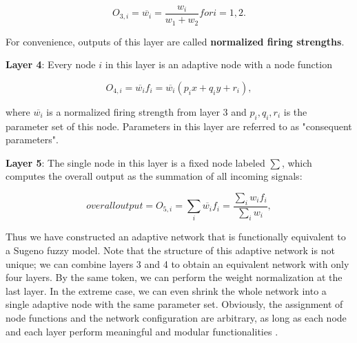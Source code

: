 \begin{equation}
\label{eq:layer3anfis}
O_{3,i} = \overline{w_i} = \frac{w_i}{w_1 + w_2} for i = 1,2. 
\end{equation}

For convenience, outputs of this layer are called \textbf{normalized firing strengths}.

\textbf{Layer 4}: Every node $i$ in this layer is an adaptive node with a node function

\begin{equation}
\label{eq:layer4anfis}
O_{4,i} = \overline{w_i}f_i = \overline{w_i}(p_ix + q_iy + r_i), 
\end{equation}

where $\overline{w_i}$ is a normalized firing strength from layer 3 and ${p_i, q_i, r_i}$ is the parameter set of this node. Parameters in this layer are referred to as "consequent parameters".

\textbf{Layer 5}: The single node in this layer is a fixed node labeled $\sum$, which computes the overall output as the summation of all incoming signals:

\begin{equation}
\label{eq:layer5anfis}
overall output = O_{5,i} = \sum\limits_{i}\overline{w_i}f_i = \frac{\sum_{i} w_if_i}{\sum_{i}w_i}, 
\end{equation}

Thus we have constructed an adaptive network that is functionally equivalent to a Sugeno fuzzy model. Note that the structure of this adaptive network is not unique; we can combine layers 3 and 4 to obtain an equivalent network with only four layers. By the same token, we can perform the weight normalization at the last layer. In the extreme case, we can even shrink the whole network into a single adaptive node with the same parameter set. Obviously, the assignment of node functions and the network configuration are arbitrary, as long as each node and each layer perform meaningful and modular functionalities \cite{jang1997neuro}.

